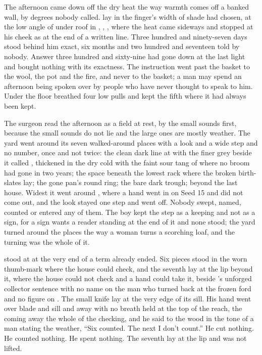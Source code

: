 The afternoon came down off the dry heat the way warmth comes off a banked wall, by degrees nobody called.  lay in the finger's width of shade  had chosen, at the low angle of  under  roof in , , , where the heat came sideways and stopped at his cheek as at the end of a written line. Three hundred and ninety-seven days stood behind him exact, six months and two hundred and seventeen told by nobody. Answer three hundred and sixty-nine had gone down at the last light and bought nothing with its exactness. The instruction went past the basket to the wool, the pot and the fire, and never to the basket; a man may spend an afternoon being spoken over by people who have never thought to speak to him. Under the floor  breathed four low pulls and kept the fifth where it had always been kept.

The surgeon read the afternoon as a field at rest, by the small sounds first, because the small sounds do not lie and the large ones are mostly weather. The yard went around its seven walked-around places with a look and a wide step and no number, once and not twice: the clean dark line at  with the finer grey beside it called , thickened in the dry cold with the faint sour tang of  where no broom had gone in two years; the space beneath the lowest rack where the broken birth-slates lay; the gone pan's round ring; the bare dark trough;  beyond the last house. Widest it went around , where a hand went in on Seed 15 and did not come out, and the look stayed one step and went off. Nobody swept, named, counted or entered any of them. The boy kept the step as a keeping and not as a sign, for a sign wants a reader standing at the end of it and none stood; the yard turned around the places the way a woman turns a scorching loaf, and the turning was the whole of it.

 stood at  at the very end of a term already ended. Six pieces stood in the worn thumb-mark where the house could check, and the seventh lay at the lip beyond it, where the house could not check and a hand could take it, beside 's unforged collector sentence with no name on the man who turned back at the frozen ford and no figure on . The small knife lay at the very edge of its sill. His hand went over blade and sill and away with no breath held at the top of the reach, the coming away the whole of the checking, and he said to the wood in the tone of a man stating the weather, “Six counted. The next I don't count.” He cut nothing. He counted nothing. He spent nothing. The seventh lay at the lip and was not lifted.

